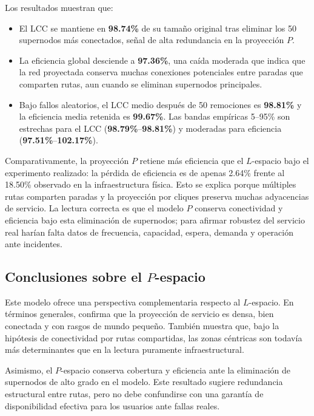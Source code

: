             Los resultados muestran que:
            \begin{itemize}
                \item El LCC se mantiene en \textbf{98.74\%} de su tamaño original tras eliminar los 50 supernodos más conectados, señal de alta redundancia en la proyección \(P\).
                \item La eficiencia global desciende a \textbf{97.36\%}, una caída moderada que indica que la red proyectada conserva muchas conexiones potenciales entre paradas que comparten rutas, aun cuando se eliminan supernodos principales.
                \item Bajo fallos aleatorios, el LCC medio después de 50 remociones es \textbf{98.81\%} y la eficiencia media retenida es \textbf{99.67\%}. Las bandas empíricas 5--95\% son estrechas para el LCC (\textbf{98.79\%}--\textbf{98.81\%}) y moderadas para eficiencia (\textbf{97.51\%}--\textbf{102.17\%}).
            \end{itemize}
            Comparativamente, la proyección \(P\) retiene más eficiencia que el \(L\)-espacio bajo el experimento realizado: la pérdida de eficiencia es de apenas 2.64\% frente al 18.50\% observado en la infraestructura física. Esto se explica porque múltiples rutas comparten paradas y la proyección por cliques preserva muchas adyacencias de servicio. La lectura correcta es que el modelo \(P\) conserva conectividad y eficiencia bajo esta eliminación de supernodos; para afirmar robustez del servicio real harían falta datos de frecuencia, capacidad, espera, demanda y operación ante incidentes.

        \subsection{Conclusiones sobre el $P$-espacio}
            Este modelo ofrece una perspectiva complementaria respecto al \(L\)-espacio. En términos generales, confirma que la proyección de servicio es densa, bien conectada y con rasgos de mundo pequeño. También muestra que, bajo la hipótesis de conectividad por rutas compartidas, las zonas céntricas son todavía más determinantes que en la lectura puramente infraestructural.

            Asimismo, el \(P\)-espacio conserva cobertura y eficiencia ante la eliminación de supernodos de alto grado en el modelo. Este resultado sugiere redundancia estructural entre rutas, pero no debe confundirse con una garantía de disponibilidad efectiva para los usuarios ante fallas reales.

